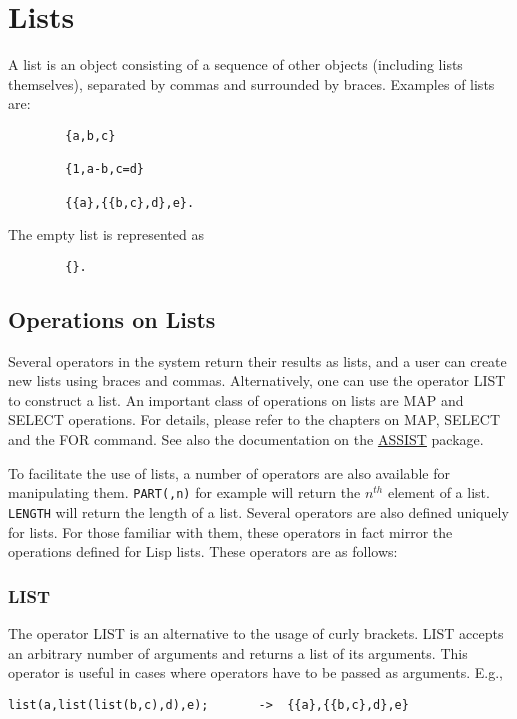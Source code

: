 \chapter{Lists}

A list is an object consisting of a sequence of other objects
(including lists themselves), separated by commas and surrounded by
braces.  Examples of lists are:
\begin{verbatim}
        {a,b,c}

        {1,a-b,c=d}

        {{a},{{b,c},d},e}.
\end{verbatim}
The empty list is represented as
\begin{verbatim}
        {}.
\end{verbatim}

\section{Operations on Lists}

Several operators in the system return their results as lists, and a user
can create new lists using braces and commas.  Alternatively, one can use
the operator LIST to construct a list.  An important class of operations
on lists are MAP and SELECT operations.  For details, please refer to the
chapters on MAP, SELECT and the FOR command.  See also the documentation
on the \hyperlink{ASSIST}{ASSIST} package.

To facilitate the use of
lists, a number of operators are also available for manipulating
them.
\texttt{PART(,n)} for example will return the
$n^{th}$ element of a list. 
\texttt{LENGTH} will return the
length of a list.  Several operators are also defined uniquely for lists.
For those familiar with them, these operators in fact mirror the
operations defined for Lisp lists.  These operators are as follows:

\subsection{LIST}
\hypertarget{operator:LIST}{}

The operator LIST is an alternative to the usage of curly brackets. LIST
accepts an arbitrary number of arguments and returns a list
of its arguments. This operator is useful in cases where operators
have to be passed as arguments. E.g.,
\begin{verbatim}
list(a,list(list(b,c),d),e);       ->  {{a},{{b,c},d},e}
\end{verbatim}

